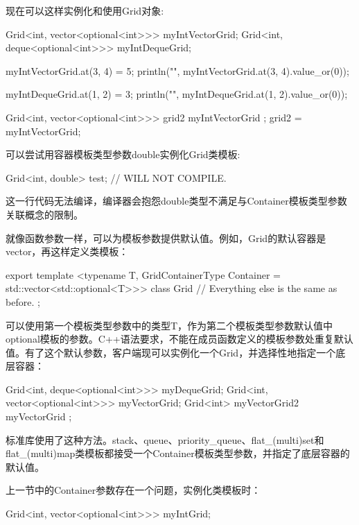 现在可以这样实例化和使用Grid对象:

\begin{cpp}
Grid<int, vector<optional<int>>> myIntVectorGrid;
Grid<int, deque<optional<int>>> myIntDequeGrid;

myIntVectorGrid.at(3, 4) = 5;
println("{}", myIntVectorGrid.at(3, 4).value_or(0));

myIntDequeGrid.at(1, 2) = 3;
println("{}", myIntDequeGrid.at(1, 2).value_or(0));

Grid<int, vector<optional<int>>> grid2 { myIntVectorGrid };
grid2 = myIntVectorGrid;
\end{cpp}

可以尝试用容器模板类型参数double实例化Grid类模板:

\begin{cpp}
Grid<int, double> test; // WILL NOT COMPILE.
\end{cpp}

这一行代码无法编译，编译器会抱怨double类型不满足与Container模板类型参数关联概念的限制。

就像函数参数一样，可以为模板参数提供默认值。例如，Grid的默认容器是vector，再这样定义类模板：

\begin{cpp}
export template <typename T,
    GridContainerType Container = std::vector<std::optional<T>>>
class Grid
{
    // Everything else is the same as before.
};
\end{cpp}

可以使用第一个模板类型参数中的类型T，作为第二个模板类型参数默认值中optional模板的参数。C++语法要求，不能在成员函数定义的模板参数处重复默认值。有了这个默认参数，客户端现可以实例化一个Grid，并选择性地指定一个底层容器：

\begin{cpp}
Grid<int, deque<optional<int>>> myDequeGrid;
Grid<int, vector<optional<int>>> myVectorGrid;
Grid<int> myVectorGrid2 { myVectorGrid };
\end{cpp}

标准库使用了这种方法。stack、queue、priority\_queue、flat\_(multi)set和flat\_(multi)map类模板都接受一个Container模板类型参数，并指定了底层容器的默认值。


上一节中的Container参数存在一个问题，实例化类模板时：

\begin{cpp}
Grid<int, vector<optional<int>>> myIntGrid;
\end{cpp}

